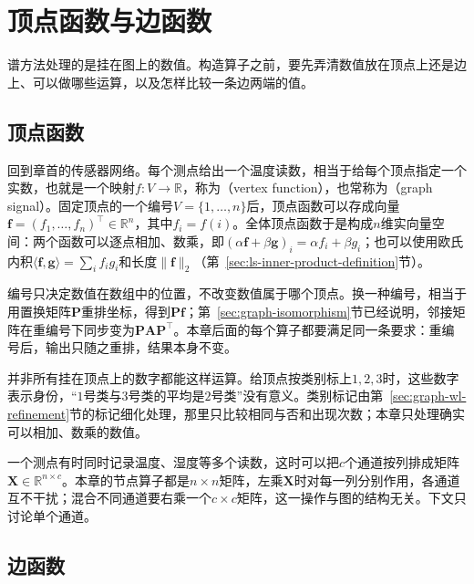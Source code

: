 
\section{顶点函数与边函数}
\label{sec:graph-vertex-edge-functions}

谱方法处理的是挂在图上的数值。构造算子之前，要先弄清数值放在顶点上还是边上、可以做哪些运算，以及怎样比较一条边两端的值。

\subsection{顶点函数}
\label{sec:graph-spec-vertex-functions}

回到章首的传感器网络。每个测点给出一个温度读数，相当于给每个顶点指定一个实数，也就是一个映射$f:V\to\mathbb R$，称为（vertex function），也常称为（graph signal）。固定顶点的一个编号$V=\{1,\ldots,n\}$后，顶点函数可以存成向量$\bm f=(f_1,\ldots,f_n)^{\top}\in\mathbb R^n$，其中$f_i=f(i)$。全体顶点函数于是构成$n$维实向量空间：两个函数可以逐点相加、数乘，即$(\alpha\bm f+\beta\bm g)_i=\alpha f_i+\beta g_i$；也可以使用欧氏内积$\langle\bm f,\bm g\rangle=\sum_if_ig_i$和长度$\lVert\bm f\rVert_2$（第~\ref{sec:ls-inner-product-definition}节）。

编号只决定数值在数组中的位置，不改变数值属于哪个顶点。换一种编号，相当于用置换矩阵$\bm P$重排坐标，得到$\bm P\bm f$；第~\ref{sec:graph-isomorphism}节已经说明，邻接矩阵在重编号下同步变为$\bm P\bm A\bm P^{\top}$。本章后面的每个算子都要满足同一条要求：重编号后，输出只随之重排，结果本身不变。

并非所有挂在顶点上的数字都能这样运算。给顶点按类别标上$1,2,3$时，这些数字表示身份，“$1$号类与$3$号类的平均是$2$号类”没有意义。类别标记由第~\ref{sec:graph-wl-refinement}节的标记细化处理，那里只比较相同与否和出现次数；本章只处理确实可以相加、数乘的数值。

一个测点有时同时记录温度、湿度等多个读数，这时可以把$c$个通道按列排成矩阵$\bm X\in\mathbb R^{n\times c}$。本章的节点算子都是$n\times n$矩阵，左乘$\bm X$时对每一列分别作用，各通道互不干扰；混合不同通道要右乘一个$c\times c$矩阵，这一操作与图的结构无关。下文只讨论单个通道。

\subsection{边函数}
\label{sec:graph-spec-edge-functions}

